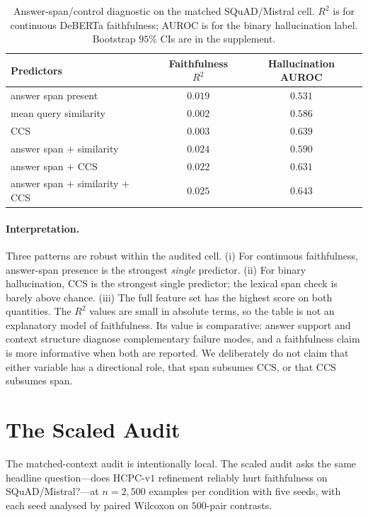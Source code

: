 \begin{table}[!htb]
\centering
\caption{Answer-span/control diagnostic on the matched SQuAD/Mistral
cell. $R^2$ is for continuous DeBERTa faithfulness; AUROC is for the
binary hallucination label. Bootstrap $95\%$ CIs are in the
supplement.}
\label{tab:span_control_main}
\footnotesize
\begin{tabular}{lcc}
\toprule
Predictors & Faithfulness $R^2$ & Hallucination AUROC \\
\midrule
answer span present                       & $0.019$ & $0.531$ \\
mean query similarity                     & $0.002$ & $0.586$ \\
CCS                                       & $0.003$ & $0.639$ \\
answer span $+$ similarity                & $0.024$ & $0.590$ \\
answer span $+$ CCS                       & $0.022$ & $0.631$ \\
answer span $+$ similarity $+$ CCS        & $\mathbf{0.025}$ & $\mathbf{0.643}$ \\
\bottomrule
\end{tabular}
\end{table}

\paragraph{Interpretation.} Three patterns are robust within the
audited cell. (i) For continuous faithfulness, answer-span presence is
the strongest \emph{single} predictor. (ii) For binary hallucination,
CCS is the strongest single predictor; the lexical span check is barely
above chance. (iii) The full feature set has the highest score on both quantities.
The $R^2$ values are small in absolute terms, so the table is not an
explanatory model of faithfulness. Its value is comparative: answer
support and context structure diagnose complementary failure modes, and
a faithfulness claim is more informative when both are reported. We
deliberately do not claim that either variable has a directional role, that
span subsumes CCS, or that CCS subsumes span.

\section{The Scaled Audit}
\label{sec:scaling}

The matched-context audit is intentionally local. The scaled audit
asks the same headline question---does HCPC-v$1$ refinement reliably
hurt faithfulness on SQuAD/Mistral?---at $n{=}2{,}500$ examples per
condition with five seeds, with each seed analysed by paired Wilcoxon
on $500$-pair contrasts.

